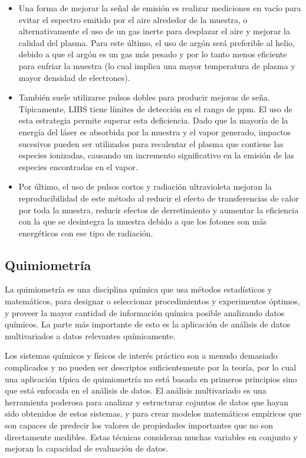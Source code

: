 \documentclass[12pt]{article}
\begin{document}
\begin{itemize}
    \item Una forma de mejorar la señal de emisión es realizar mediciones en vacío para evitar el espectro emitido por el aire alrededor de la muestra, o alternativamente el uso de un gas inerte para desplazar el aire y mejorar la calidad del plasma. Para este último, el uso de argón será preferible al helio, debido a que el argón es un gas más pesado y por lo tanto menos eficiente para enfriar la muestra (lo cual implica una mayor temperatura de plasma y mayor densidad de electrones).

    \item También suele utilizarse pulsos dobles para producir mejoras de seña. Típicamente, LIBS tiene límites de detección en el rango de ppm. El uso de esta estrategia permite superar esta deficiencia. Dado que la mayoría de la energía del láser es absorbida por la muestra y el vapor generado, impactos sucesivos pueden ser utilizados para recalentar el plasma que contiene las especies ionizadas, causando un incremento significativo en la emisión de las especies encontradas en el vapor.

    \item Por último, el uso de pulsos cortos y radiación ultravioleta mejoran la reproducibilidad de este método al reducir el efecto de transferencias de calor por toda la muestra, reducir efectos de derretimiento y aumentar la eficiencia con la que se desintegra la muestra debido a que los fotones son más energéticos con ese tipo de radiación.
\end{itemize}

\subsection{Quimiometría}

La quimiometría es una disciplina química que usa métodos estadísticos y matemáticos, para designar o seleccionar procedimientos y experimentos óptimos, y proveer la mayor cantidad de información química posible analizando datos químicos\cite{Chemo}. La parte más importante de esto es la aplicación de análisis de datos multivariados a datos relevantes químicamente. 

Los sistemas químicos y físicos de interés práctico son a menudo demasiado complicados y no pueden ser descriptos suficientemente por la teoría, por lo cual una aplicación típica de quimiometría no está basada en primeros principios sino que está enfocada en el análisis de datos. El análisis multivariado es una herramienta poderosa para analizar y estructurar cojuntos de datos que hayan sido obtenidos de estos sistemas, y para crear modelos matemáticos empíricos que son capaces de predecir los valores de propiedades importantes que no son directamente medibles. Estas técnicas consideran muchas variables en conjunto y mejoran la capacidad de evaluación de datos.
\end{document}
